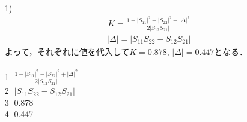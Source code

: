 \begin{itemize}
    \setlength{\itemsep}{5mm}
    \item[1)] 
    \begin{eqnarray*}
        K=\frac{1-|S_{11}|^2-|S_{22}|^2+|\Delta|^2}{2|S_{12}S_{21}|}
    \end{eqnarray*}
    \begin{eqnarray*}
        |\Delta|=|S_{11}S_{22}-S_{12}S_{21}|
    \end{eqnarray*}
    よって，それぞれに値を代入して$K=0.878$, $|\Delta|=0.447$となる．\\
    \\
    \textcircled{\scriptsize1} $\frac{1-|S_{11}|^2-|S_{22}|^2+|\Delta|^2}{2|S_{12}S_{21}|}$\\
    \textcircled{\scriptsize2} $|S_{11}S_{22}-S_{12}S_{21}|$\\
    \textcircled{\scriptsize3} 0.878\\
    \textcircled{\scriptsize4} 0.447


\end{itemize}
